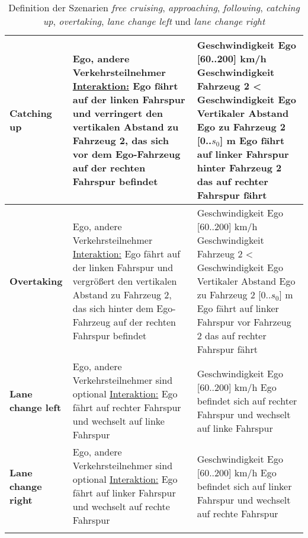 \begin{longtable}[c]{p{2.5cm} p{5.5cm} p{5.5cm}}
\textbf{Catching up} & Ego, andere Verkehrsteilnehmer \newline \underline{Interaktion:} Ego fährt auf der linken Fahrspur und verringert den vertikalen Abstand zu Fahrzeug 2, das sich vor dem Ego-Fahrzeug auf der rechten Fahrspur befindet & Geschwindigkeit Ego [60..200] km/h \newline Geschwindigkeit Fahrzeug 2 < Geschwindigkeit Ego \newline Vertikaler Abstand Ego zu Fahrzeug 2 [0..$s_0$] m \newline Ego fährt auf linker Fahrspur hinter Fahrzeug 2 das auf rechter Fahrspur fährt \\
\hline

\textbf{Overtaking} & Ego, andere Verkehrsteilnehmer \newline \underline{Interaktion:} Ego fährt auf der linken Fahrspur und vergrößert den vertikalen Abstand zu Fahrzeug 2, das sich hinter dem Ego-Fahrzeug auf der rechten Fahrspur befindet & Geschwindigkeit Ego [60..200] km/h \newline Geschwindigkeit Fahrzeug 2 < Geschwindigkeit Ego \newline Vertikaler Abstand Ego zu Fahrzeug 2 [0..$s_0$] m \newline Ego fährt auf linker Fahrspur vor Fahrzeug 2 das auf rechter Fahrspur fährt \\
\hline

\textbf{Lane change left} & Ego, andere Verkehrsteilnehmer sind optional \newline \underline{Interaktion:} Ego fährt auf rechter Fahrspur und wechselt auf linke Fahrspur & Geschwindigkeit Ego [60..200] km/h \newline Ego befindet sich auf rechter Fahrspur und wechselt auf linke Fahrspur \\
\hline

\textbf{Lane change right} & Ego, andere Verkehrsteilnehmer sind optional \newline \underline{Interaktion:} Ego fährt auf linker Fahrspur und wechselt auf rechte Fahrspur & Geschwindigkeit Ego [60..200] km/h \newline Ego befindet sich auf linker Fahrspur und wechselt auf rechte Fahrspur \\
\hline

\caption{Definition der Szenarien \textit{free cruising}, \textit{approaching}, \textit{following}, \textit{catching up}, \textit{overtaking}, \textit{lane change left} und \textit{lane change right}}
\label{tab_definition_szenarios}
\end{longtable}

